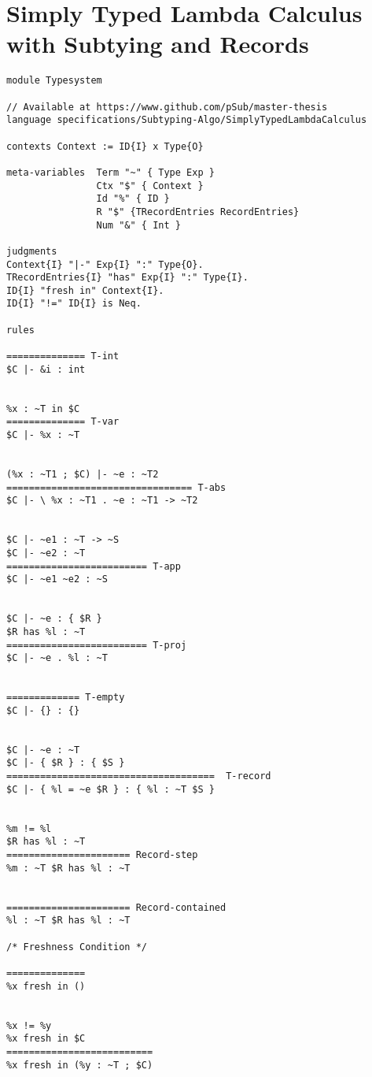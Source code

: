 \newpage
\section{Simply Typed Lambda Calculus with Subtying and Records}
\label{appendix:stlc-records}

\begin{lstlisting}[language=sltc]
module Typesystem

// Available at https://www.github.com/pSub/master-thesis
language specifications/Subtyping-Algo/SimplyTypedLambdaCalculus

contexts Context := ID{I} x Type{O}

meta-variables  Term "~" { Type Exp }
                Ctx "$" { Context }
                Id "%" { ID }
                R "$" {TRecordEntries RecordEntries}
                Num "&" { Int }

judgments
Context{I} "|-" Exp{I} ":" Type{O}.
TRecordEntries{I} "has" Exp{I} ":" Type{I}.
ID{I} "fresh in" Context{I}.
ID{I} "!=" ID{I} is Neq.

rules

============== T-int
$C |- &i : int


%x : ~T in $C
============== T-var
$C |- %x : ~T


(%x : ~T1 ; $C) |- ~e : ~T2
================================= T-abs
$C |- \ %x : ~T1 . ~e : ~T1 -> ~T2


$C |- ~e1 : ~T -> ~S
$C |- ~e2 : ~T
========================= T-app
$C |- ~e1 ~e2 : ~S


$C |- ~e : { $R }
$R has %l : ~T
========================= T-proj
$C |- ~e . %l : ~T


============= T-empty
$C |- {} : {}


$C |- ~e : ~T
$C |- { $R } : { $S }
=====================================  T-record
$C |- { %l = ~e $R } : { %l : ~T $S }


%m != %l
$R has %l : ~T
====================== Record-step
%m : ~T $R has %l : ~T 


====================== Record-contained
%l : ~T $R has %l : ~T

/* Freshness Condition */

==============
%x fresh in ()


%x != %y
%x fresh in $C
==========================
%x fresh in (%y : ~T ; $C)
\end{lstlisting}
\newpage
